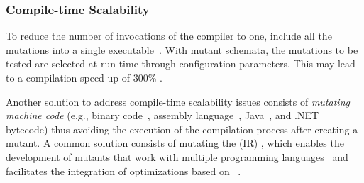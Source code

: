 %

\subsubsection{Compile-time Scalability}
\label{sec:compile:time}


To reduce the number of invocations of the compiler to one,  include all the mutations into a single executable~\cite{untch1993mutation}.
With mutant schemata, the mutations to be tested are selected at run-time through configuration parameters. This may lead to a compilation speed-up of 300\% \cite{papadakis2010automatic}.


Another solution to address compile-time scalability issues consists of \emph{mutating machine code}  (e.g., binary code~\cite{becker2012xemu}, assembly language~\cite{crouzet2006sesame},
Java~\cite{ma2006mujava},
 and
.NET~\cite{derezinska2011object} bytecode) thus avoiding the execution of the compilation process after creating a mutant.
A common solution consists of mutating the
  (IR) \cite{hariri2016evaluating},
which enables the development of mutants that work with multiple programming languages~\cite{hariri2019comparing} and facilitates the integration of optimizations based on ~\cite{denisov2018mull}.


